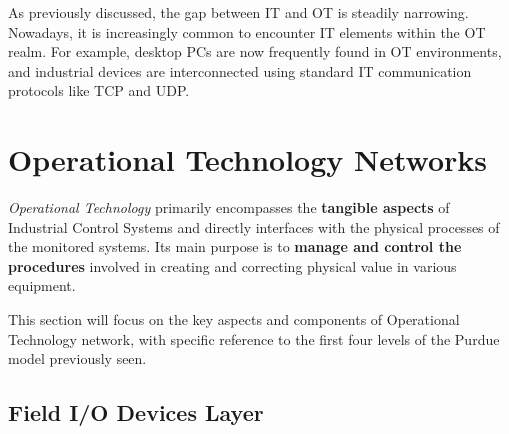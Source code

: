 As previously discussed, the gap between IT and OT is steadily narrowing. Nowadays, it is increasingly common to encounter IT elements within the OT realm. For example, desktop PCs are now frequently found in OT environments, and industrial devices are interconnected using standard IT communication protocols like TCP and UDP.

\section{Operational Technology Networks}
\label{subsec:2_ot_network}

\textit{Operational Technology} primarily encompasses the \textbf{tangible aspects} of Industrial Control Systems and directly interfaces with the physical processes of the monitored systems. Its main purpose is to \textbf{manage and control the procedures} involved in creating and correcting physical value in various equipment.

This section will focus on the key aspects and components of Operational Technology network, with specific reference to the first four levels of the Purdue model previously seen.




\subsection{Field I/O Devices Layer}
\label{subsec:2_ot_field_io_devs}

